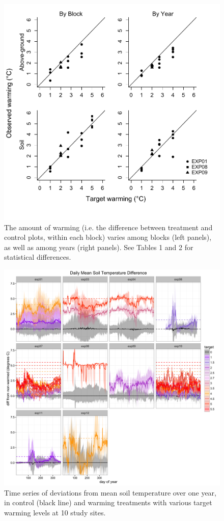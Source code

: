 \documentclass{article}
\begin{document}
 \begin{figure}[p]
     \centering
 \includegraphics{../figures/BothWarmingbyblockyear.pdf}    
 \caption{The amount of warming (i.e. the difference between treatment and control plots, within each block) varies among blocks (left panels), as well as among years (right panels). See Tables 1 and 2 for statistical differences.}
 \end{figure}

 \begin{figure}[p]
     \centering
 \includegraphics{../figures/Exploratory_TimeSeries_SoilTemp1Mean_Deviation.png}    
 \caption{Time series of deviations from mean soil temperature over one year, in control (black line) and warming treatments with various target warming levels at 10 study sites.}
 \end{figure}
\end{document}
